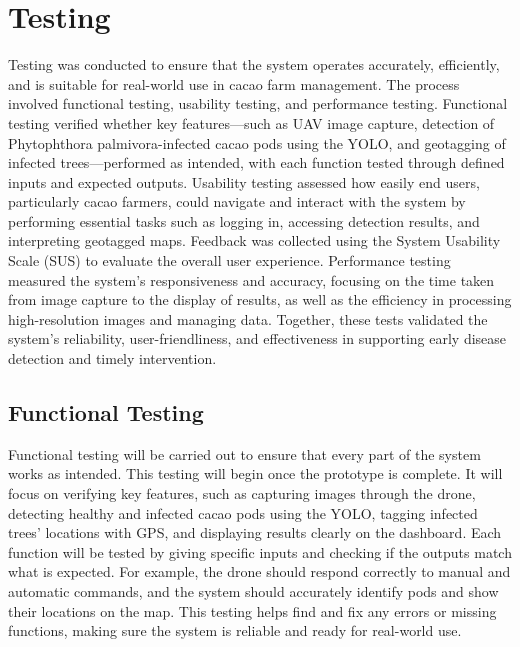 \section{Testing}
Testing was conducted to ensure that the system operates accurately, efficiently, and is suitable for real-world use in cacao farm management. The process involved functional testing, usability testing, and performance testing. Functional testing verified whether key features—such as UAV image capture, detection of Phytophthora palmivora-infected cacao pods using the YOLO, and geotagging of infected trees—performed as intended, with each function tested through defined inputs and expected outputs. Usability testing assessed how easily end users, particularly cacao farmers, could navigate and interact with the system by performing essential tasks such as logging in, accessing detection results, and interpreting geotagged maps. Feedback was collected using the System Usability Scale (SUS) to evaluate the overall user experience. Performance testing measured the system’s responsiveness and accuracy, focusing on the time taken from image capture to the display of results, as well as the efficiency in processing high-resolution images and managing data. Together, these tests validated the system’s reliability, user-friendliness, and effectiveness in supporting early disease detection and timely intervention.

\subsection{Functional Testing}
Functional testing will be carried out to ensure that every part of the system works as intended. This testing will begin once the prototype is complete. It will focus on verifying key features, such as capturing images through the drone, detecting healthy and infected cacao pods using the YOLO, tagging infected trees’ locations with GPS, and displaying results clearly on the dashboard. Each function will be tested by giving specific inputs and checking if the outputs match what is expected. For example, the drone should respond correctly to manual and automatic commands, and the system should accurately identify pods and show their locations on the map. This testing helps find and fix any errors or missing functions, making sure the system is reliable and ready for real-world use.

